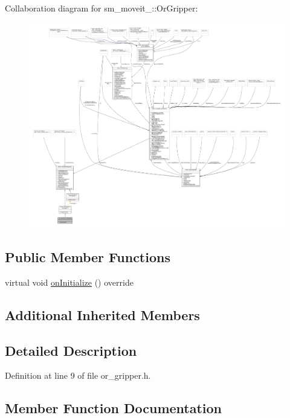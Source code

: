 Collaboration diagram for sm\+\_\+moveit\+\_\+:\+:Or\+Gripper\+:
\nopagebreak
\begin{figure}[H]
\begin{center}
\leavevmode
\includegraphics[width=350pt]{classsm__moveit__2_1_1OrGripper__coll__graph}
\end{center}
\end{figure}
\subsection*{Public Member Functions}
\begin{DoxyCompactItemize}
\item 
virtual void \hyperlink{classsm__moveit__2_1_1OrGripper_a7518a7ebebbc382e98ff93394f5a119c}{on\+Initialize} () override
\end{DoxyCompactItemize}
\subsection*{Additional Inherited Members}


\subsection{Detailed Description}


Definition at line 9 of file or\+\_\+gripper.\+h.



\subsection{Member Function Documentation}
\mbox{\label{classsm__moveit__2_1_1OrGripper_a7518a7ebebbc382e98ff93394f5a119c}} 
